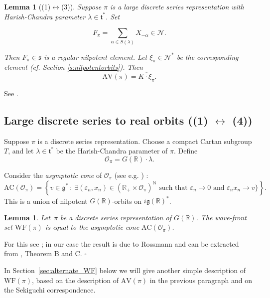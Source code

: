 \documentclass[10pt,leqno]{article}
\newtheorem{lemma}[equation]{Lemma}
\newcommand{\qed}{\hfill $\square$ \medskip}
\newcommand{\R}{\mathbb R}
\newcommand{\N}{\mathcal N}
\renewcommand{\t}{\mathfrak t}
\newcommand{\g}{\mathfrak g}
\newcommand{\s}{\mathfrak s}
\newcommand{\AV}{\mathrm{AV}}
\newcommand{\WF}{\mathrm{WF}}
\newcommand{\AC}{\mathrm{AC}}
\begin{document}
\begin{lemma}[(1)$\leftrightarrow$(3)]\label{l:pi_to_av}
Suppose $\pi$ is a large discrete series representation with Harish-Chandra parameter $\lambda\in\t^*$.
Set

\begin{equation}
  \label{e:Fpi}
  F_\pi=\sum_{\alpha\in S(\lambda)}X_{-\alpha}\in \N.
\end{equation}

Then $F_\pi\in\s$ is a regular nilpotent element. Let $\xi_\pi\in \N^*$ be the corresponding element (cf. Section \ref{s:nilpotentorbits}).
Then 
$$
\AV(\pi)=\overline{K\cdot \xi_\pi}.
$$
\end{lemma}

See
\cite[Propositions A.7 and A.9]{AV1}.


\subsection{Large discrete series to real orbits ((1) $\leftrightarrow$ (4))}


Suppose $\pi$ is a discrete series representation.
Choose a compact Cartan subgroup $T$, and let $\lambda\in\t^*$ be the Harish-Chandra parameter of $\pi$.
Define
\begin{equation} \label{semisimple_orbit_HC} \mathcal{O}_{\pi}=G(\R)\cdot\lambda.\end{equation}

Consider the \emph{asymptotic cone} of $\mathcal{O}_\pi$ (see e.g. \cite[Section 3]{AVAV}) :
\[ \AC(\mathcal{O}_\pi) = \left\{ v \in \g^* \ : \ \text{$\exists (\varepsilon_n, x_n)\in (\R_+ \times \mathcal{O}_\pi)^\mathbb{N}$ such that $\varepsilon_n \to 0$ and $\varepsilon_n x_n \to v$}\}  \right\}. \]
This is a union of nilpotent $G(\R)$-orbits on $i\g(\R)^*$.

\begin{lemma} \label{lem:WF_and_AC}
Let~$\pi$ be a discrete series representation of $G(\R)$. The wave-front set $\WF(\pi)$ is equal to the asymptotic cone $\AC(\mathcal{O}_\pi)$.
\end{lemma}

For this see \cite{HarrisHeOlafsson}; in our case the result is due to Rossmann and can be extracted from \cite{RossmannPicard}, Theorem B and C. \qed

In Section~\ref{sec:alternate_WF} below we will  give another simple description of~$\WF(\pi)$, based on the description of $\AV(\pi)$ in the previous paragraph and on the Sekiguchi correspondence. 
\end{document}
